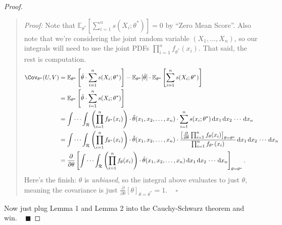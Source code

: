\begin{proof}
\begin{quote}
        \emph{Proof:} Note that $\mathbb{E}_{\theta^*}\left[
            \sum_{i = 1}^n s(X_i; \theta^*)
        \right] = 0$ by ``Zero Mean Score''.
        Also note that we're considering
        the joint random variable $(X_1, \dots, X_n)$,
        so our integrals will need to use the joint PDFs $\prod_{i = 1}^n f_{\theta^*}(x_i)$.
        That said, the rest is computation.
        \begin{align*}
        \Cov_{\theta^*}(U, V)
        & = \mathbb{E}_{\theta^*}\left[\hat{\theta} \cdot \sum_{i = 1}^n s(X_i; \theta^*)\right] -
        \mathbb{E}_{\theta^*}[\hat{\theta}] \cdot
        \mathbb{E}_{\theta^*}\left[\sum_{i = 1}^n s(X_i; \theta^*)\right] \\
        & = \mathbb{E}_{\theta^*}\left[\hat{\theta} \cdot \sum_{i = 1}^n s(X_i; \theta^*)\right] \\
        & = \int \cdots \int_{\mathcal{R}} \left(\prod_{i = 1}^n f_{\theta^*}(x_i)\right) \cdot
        \hat{\theta}(x_1, x_2, \dots, x_n) \cdot \sum_{i = 1}^n s(x_i; \theta^*)
        \, \mathrm{d}x_1 \, \mathrm{d}x_2 \, \cdots \, \mathrm{d}x_n \\
        & = \int \cdots \int_{\mathcal{R}} \left(\prod_{i = 1}^n f_{\theta^*}(x_i)\right) \cdot
        \hat{\theta}(x_1, x_2, \dots, x_n) \cdot
        \frac{
            \left[\frac{\partial}{\partial\theta}
            \prod_{i = 1}^n f_{\theta}(x_i)\right]_{\theta = \theta^*}
        }{\prod_{i = 1}^n f_{\theta^*}(x_i)}
        \, \mathrm{d}x_1 \, \mathrm{d}x_2 \, \cdots \, \mathrm{d}x_n \\
        & = \frac{\partial}{\partial\theta} \left[
        \int \cdots \int_{\mathcal{R}} \left(\prod_{i = 1}^n f_{\theta}(x_i)\right) \cdot
        \hat{\theta}(x_1, x_2, \dots, x_n)
        \, \mathrm{d}x_1 \, \mathrm{d}x_2 \, \cdots \, \mathrm{d}x_n
        \right]_{\theta = \theta^*}.
        \end{align*}
        Here's the finish: $\hat{\theta}$ is \emph{unbiased}, so
        the integral above evaluates to just $\theta$,
        meaning the covariance is just
        $\frac{\partial}{\partial\theta}[\theta]_{\theta = \theta^*} = 1$.
        ~ $\square$
    \end{quote}
    Now just plug Lemma 1 and Lemma 2 into the Cauchy-Schwarz theorem and win. ~ $\blacksquare$
\end{proof}

